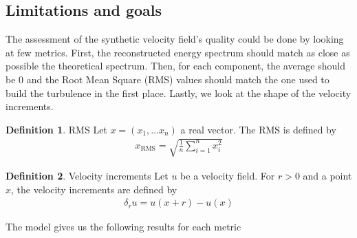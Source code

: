 \documentclass[a4paper,12pt]{article}
\theoremstyle{definition}
\newtheorem{definition}{Definition}
\begin{document}

\subsection{Limitations and goals}
The assessment of the synthetic velocity field's quality could be done by looking at few metrics. First, the reconstructed energy spectrum should match as close as possible the theoretical spectrum. Then, for each component, the average should be 0 and the Root Mean Square (RMS) values should match the one used to build the turbulence in the first place. Lastly, we look at the shape of the velocity increments. \\

\begin{definition}{RMS}
    Let $x=(x_1,\ldots x_n)$ a real vector. The RMS is defined by 
    \begin{align}
        x_\text{RMS} = \sqrt{\frac{1}{n}\sum_{i=1}^{n}x_i^2}
    \end{align}
\end{definition}

\begin{definition}{Velocity increments}
    Let $u$ be a velocity field. For $r>0$ and a point $x$, the velocity increments are defined by 
    \begin{align}
        \delta_r u = u(x+r)-u(x) 
        \label{DefVelIncr}
    \end{align}
\end{definition}

The model gives us the following results for each metric 
\end{document}
